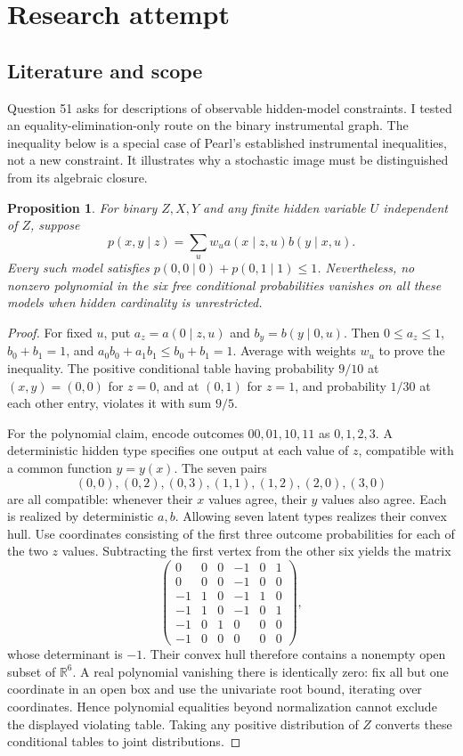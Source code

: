 \documentclass[11pt]{article}
\newtheorem{proposition}{Proposition}
\begin{document}
\section{Research attempt}
\subsection{Literature and scope}
Question 51 asks for descriptions of observable hidden-model constraints. I tested an equality-elimination-only route on the binary instrumental graph. The inequality below is a special case of Pearl's established instrumental inequalities, not a new constraint. It illustrates why a stochastic image must be distinguished from its algebraic closure.
\begin{proposition}
For binary $Z,X,Y$ and any finite hidden variable $U$ independent of $Z$, suppose
\[
p(x,y\mid z)=\sum_u w_u a(x\mid z,u)b(y\mid x,u).
\]
Every such model satisfies $p(0,0\mid0)+p(0,1\mid1)\le1$. Nevertheless, no nonzero polynomial in the six free conditional probabilities vanishes on all these models when hidden cardinality is unrestricted.
\end{proposition}
\begin{proof}
For fixed $u$, put $a_z=a(0\mid z,u)$ and $b_y=b(y\mid0,u)$. Then $0\le a_z\le1$, $b_0+b_1=1$, and $a_0b_0+a_1b_1\le b_0+b_1=1$. Average with weights $w_u$ to prove the inequality. The positive conditional table having probability $9/10$ at $(x,y)=(0,0)$ for $z=0$, and at $(0,1)$ for $z=1$, and probability $1/30$ at each other entry, violates it with sum $9/5$.

For the polynomial claim, encode outcomes $00,01,10,11$ as $0,1,2,3$. A deterministic hidden type specifies one output at each value of $z$, compatible with a common function $y=y(x)$. The seven pairs
\[
(0,0),(0,2),(0,3),(1,1),(1,2),(2,0),(3,0)
\]
are all compatible: whenever their $x$ values agree, their $y$ values also agree. Each is realized by deterministic $a,b$. Allowing seven latent types realizes their convex hull. Use coordinates consisting of the first three outcome probabilities for each of the two $z$ values. Subtracting the first vertex from the other six yields the matrix
\[
\begin{pmatrix}
0&0&0&-1&0&1\\0&0&0&-1&0&0\\
-1&1&0&-1&1&0\\-1&1&0&-1&0&1\\
-1&0&1&0&0&0\\-1&0&0&0&0&0
\end{pmatrix},
\]
whose determinant is $-1$. Their convex hull therefore contains a nonempty open subset of $\mathbb R^6$. A real polynomial vanishing there is identically zero: fix all but one coordinate in an open box and use the univariate root bound, iterating over coordinates. Hence polynomial equalities beyond normalization cannot exclude the displayed violating table. Taking any positive distribution of $Z$ converts these conditional tables to joint distributions.
\end{proof}
\end{document}
